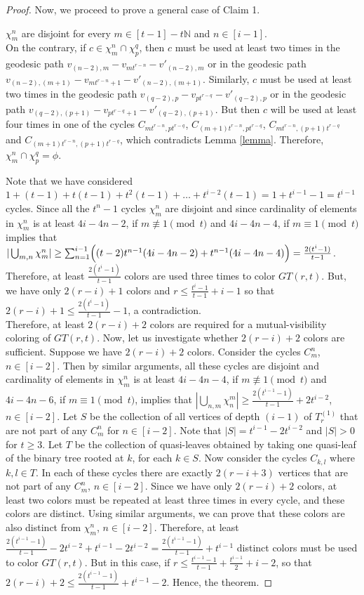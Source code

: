 \documentclass[12pt]{article}
\def\ni{\noindent}
\begin{document}
\begin{proof}
Now, we proceed to prove a general case of Claim 1.\par
\ni{\textbf{Claim 2:}}  $\chi^n_m$ are disjoint for every $m \in [t-1]-t\mathbb{N}$ and $n \in [i-1]$.\\
	 On the contrary, if $c \in \chi^n_m \cap \chi^q_p$, then $c$ must be used at least two times in the geodesic path $v_{(n-2),m}-v_{mt^{r-n}}-v'_{(n-2),m}$ or in the geodesic path $v_{(n-2),(m+1)}-v_{mt^{r-n}+1}-v'_{(n-2),(m+1)}$. Similarly, $c$ must be used at least two times in the geodesic path $v_{(q-2),p}-v_{pt^{r-q}}-v'_{(q-2),p}$ or in the geodesic path $v_{(q-2),(p+1)}-v_{pt^{r-q}+1}-v'_{(q-2),(p+1)}$. But then $c$ will be used at least four times in one of the cycles $C_{mt^{r-n},pt^{r-q}}$, $C_{(m+1)t^{r-n},pt^{r-q}}$, $C_{mt^{r-n},(p+1)t^{r-q}}$ and $C_{(m+1)t^{r-n},(p+1)t^{r-q}}$, which contradicts Lemma \ref{lemma}. Therefore, $\chi^n_m \cap \chi^q_p = \phi$.\par
Note that we have considered $1+(t-1)+t(t-1)+t^2(t-1)+\ldots+t^{i-2}(t-1) = 1+ t^{i-1} - 1 = t^{i-1}$ cycles. Since all the $t^n-1$ cycles $\chi^n_m$ are disjoint and since cardinality of  elements in $\chi^n_m$ is at least $4i-4n-2$, if  $ m \not \equiv 1 \pmod t$ and $4i-4n-4$, if  $ m \equiv 1 \pmod t$ implies that $|\bigcup_{m,n} \chi^n_m| \geq \sum_{n=1}^{i-1}\Bigl ( (t-2) t^{n-1}(4i-4n-2) + t^{n-1}(4i-4n-4) \Bigr)= \frac{2(t^{i}-1)}{t-1}$. Therefore, at least $\frac{2(t^{i}-1)}{t-1}$ colors are used three times to color $GT(r,t)$. But, we have only $2(r-i)+1 $ colors and $r \leq  \frac{t^i-1}{t-1}+i-1$ so that $2(r-i)+1 \leq \frac{2(t^{i}-1)}{t-1}-1$, a contradiction. \\
Therefore, at least $2(r-i)+2$ colors are required for a mutual-visibility coloring of $GT(r,t)$. Now, let us investigate whether $2(r-i)+2$ colors are sufficient.		
Suppose we have $2(r-i)+2$ colors. Consider the cycles $C_m^n$, $n \in [i-2]$. Then by similar arguments, all these cycles  are disjoint and  cardinality of  elements in $\chi^n_m$ is at least $4i-4n-4$, if  $ m \not \equiv 1 \pmod t$ and $4i-4n-6$, if  $ m \equiv 1 \pmod t$, implies that $|\bigcup_{n,m} \chi^m_n| \geq  \frac{2(t^{i-1}-1)}{t-1} + 2t^{i-2}$, $n\in [i-2]$. Let $S$ be the collection of all vertices of depth $(i-1)$ of  $T_r^{(1)}$ that are not part of any $C_m^n$ for $n\in [i-2]$. Note that  $|S|=t^{i-1}-2t^{i-2}$ and $|S| >0$ for $t\geq 3$. Let $T$ be the collection of quasi-leaves obtained by taking one quasi-leaf of the binary tree rooted at $k$, for each $k \in S$. Now consider the cycles $C_{k,l}$ where $k,l \in T$. In each of these cycles there are exactly $2(r-i+3)$ vertices that are not part of any $C_m^n$, $n \in [i-2]$. Since we have only $2(r - i) + 2$ colors, at least two colors must be repeated at least three times in every cycle, and these colors are distinct. Using similar arguments, we can prove that these colors are also distinct from $\chi_m^n$, $n \in [i-2]$. Therefore, at least $\frac{2(t^{i-1}-1)}{t-1} -2t^{i-2} + t^{i-1}-2t^{i-2}=\frac{2(t^{i-1}-1)}{t-1} +t^{i-1}$ distinct colors must be used to color $GT(r,t)$.  But in this case, if  $r \leq \frac{t^{i-1}-1}{t-1}+\frac{t^{i-1}}{2}+i-2$, so that $2(r-i)+2 \leq \frac{2(t^{i-1}-1)}{t-1}+t^{i-1}-2$.
Hence, the theorem.
\end{proof}
    
\end{document}
